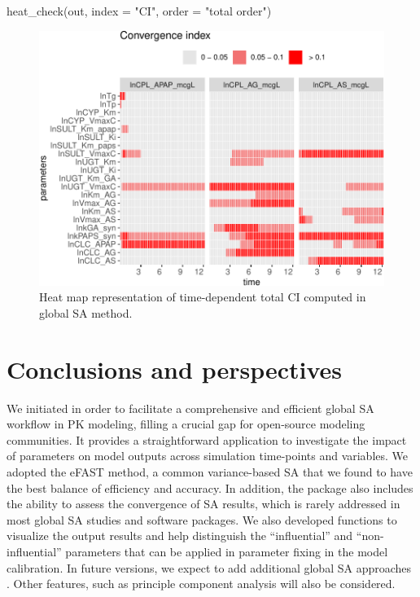 \begin{Schunk}
\begin{Sinput}
heat_check(out, index = "CI", order = "total order")
\end{Sinput}
\begin{figure}

{\centering \includegraphics[width=0.8\linewidth]{RJ-pksensi_files/figure-latex/unnamed-chunk-32-1} 

}

\caption{\label{fig:Heat-CI}Heat map representation of time-dependent total CI computed in global SA method.}\label{fig:unnamed-chunk-32}
\end{figure}
\end{Schunk}

\hypertarget{conclusions-and-perspectives}{%
\section{Conclusions and
perspectives}\label{conclusions-and-perspectives}}

We initiated  in order to facilitate a comprehensive
and efficient global SA workflow in PK modeling, filling a crucial gap
for open-source modeling communities. It provides a straightforward
application to investigate the impact of parameters on model outputs
across simulation time-points and variables. We adopted the eFAST
method, a common variance-based SA that we found to have the best
balance of efficiency and accuracy. In addition, the package also
includes the ability to assess the convergence of SA results, which is
rarely addressed in most global SA studies and software packages. We
also developed functions to visualize the output results and help
distinguish the ``influential'' and ``non-influential'' parameters that
can be applied in parameter fixing in the model calibration. In future
versions, we expect to add additional global SA approaches
\citep{glen2012estimating, ring2017identifying}. Other features, such as
principle component analysis \citep{lamboni2011multivariate} will also
be considered.

